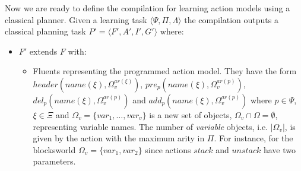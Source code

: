 \documentclass[letterpaper]{article} %
\newcommand{\tup}[1]{{\langle #1 \rangle}}
\begin{document}
Now we are ready to define the compilation for learning action models using a classical planner. Given a learning task $\tup{\Psi,\Pi,\Lambda}$ the compilation outputs a classical planning task $P'=\tup{F',A',I',G'}$ where:
\begin{itemize}
\item $F'$ extends $F$ with:
\begin{itemize}
\item Fluents representing the programmed action model. They have the form $header(name(\xi),\Omega_v^{ar(\xi)})$, $pre_p(name(\xi),\Omega_v^{ar(p)})$, $del_p(name(\xi),\Omega_v^{ar(p)})$ and $add_p(name(\xi),\Omega_v^{ar(p)})$ where $p\in \Psi$, $\xi\in\Xi$ and $\Omega_v=\{var_1,\ldots,var_v\}$ is a new set of objects, $\Omega_v\cap\Omega=\emptyset$, representing variable names. The number of {\em variable} objects, i.e. $|\Omega_v|$, is given by the action with the maximum arity in $\Pi$. For instance, for the blocksworld $\Omega_v=\{var_1,var_2\}$ since actions $stack$ and $unstack$ have two parameters.


\end{itemize}
\end{itemize}
\end{document}
